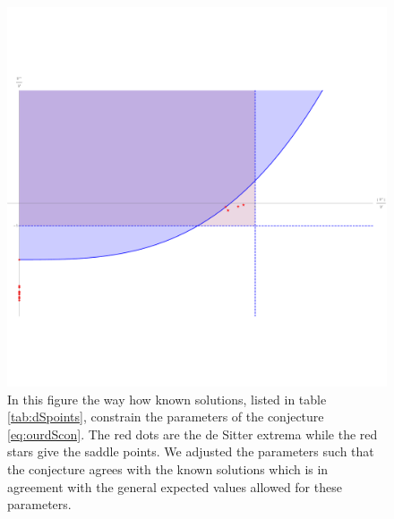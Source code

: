 \documentclass[12pt]{report}
\begin{document}
\begin{figure}[htb]
     \centering
     \includegraphics[trim=0 210 0 180,clip,width=\textwidth]{constpara.pdf}
     \caption{In this figure the way how known solutions, listed in table \ref{tab:dSpoints}, constrain the parameters of the conjecture \eqref{eq:ourdScon}. The red dots are the de Sitter extrema while the red stars give the saddle points. We adjusted the parameters such that the conjecture agrees with the known solutions which is in agreement with the general expected values allowed for these parameters.}
     \label{fig:constconj}
\end{figure}
\end{document}
